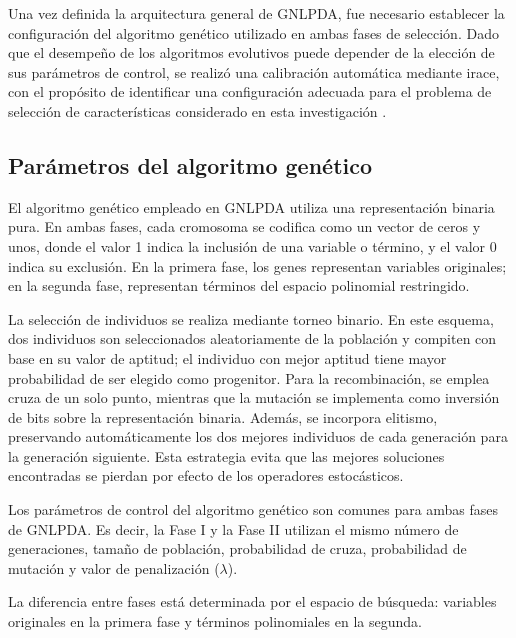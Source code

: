 Una vez definida la arquitectura general de GNLPDA, fue necesario establecer la
configuración del algoritmo genético utilizado en ambas fases de selección. Dado que el desempeño de los algoritmos evolutivos puede depender de la elección de sus parámetros de control, se realizó una calibración automática mediante irace, con el propósito de identificar una configuración adecuada para el problema de selección de características considerado en esta investigación \cite{lopez2016irace}.

\subsection{Parámetros del algoritmo genético}

El algoritmo genético empleado en GNLPDA utiliza una representación binaria pura. En
ambas fases, cada cromosoma se codifica como un vector de ceros y unos, donde el valor 1 indica la inclusión de una variable o término, y el valor 0 indica su exclusión. En la primera fase, los genes representan variables originales; en la segunda fase, representan términos del espacio polinomial restringido.

La selección de individuos se realiza mediante torneo binario. En este esquema, dos individuos son seleccionados aleatoriamente de la población y compiten con base en su valor de aptitud; el individuo con mejor aptitud tiene mayor probabilidad de ser elegido como progenitor. Para la recombinación, se emplea cruza de un solo punto, mientras que la mutación se implementa como inversión de bits sobre la
representación binaria. Además, se incorpora elitismo, preservando automáticamente los dos mejores individuos de cada generación para la generación siguiente. Esta estrategia evita que las mejores soluciones encontradas se pierdan por efecto de los operadores estocásticos.

Los parámetros de control del algoritmo genético son comunes para ambas fases de
GNLPDA. Es decir, la Fase I y la Fase II utilizan el mismo número de generaciones, tamaño de población, probabilidad de cruza, probabilidad de mutación y valor de penalización ($\lambda$).

La diferencia entre fases está determinada por el espacio de búsqueda: variables originales en la primera fase y términos polinomiales en la segunda.

